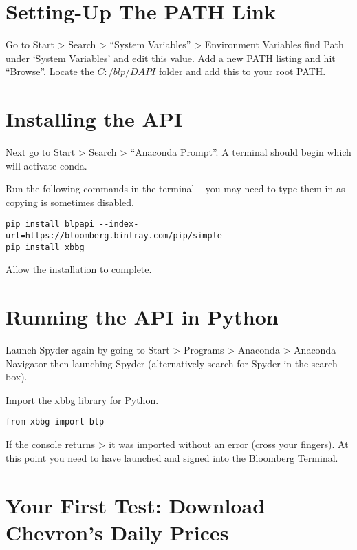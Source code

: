 \documentclass[]{book}
\begin{document}
\section{Setting-Up The PATH Link}\label{setting-up-the-path-link}

Go to Start \textgreater{} Search \textgreater{} ``System Variables''
\textgreater{} Environment Variables find Path under `System Variables'
and edit this value. Add a new PATH listing and hit ``Browse''. Locate
the \(C:/ blp/DAPI\) folder and add this to your root PATH.

\section{Installing the API}\label{installing-the-api}

Next go to Start \textgreater{} Search \textgreater{} ``Anaconda
Prompt''. A terminal should begin which will activate conda.

Run the following commands in the terminal -- you may need to type them
in as copying is sometimes disabled.

\begin{verbatim}
pip install blpapi --index-url=https://bloomberg.bintray.com/pip/simple
pip install xbbg
\end{verbatim}

Allow the installation to complete.

\section{Running the API in Python}\label{running-the-api-in-python}

Launch Spyder again by going to Start \textgreater{} Programs
\textgreater{} Anaconda \textgreater{} Anaconda Navigator then launching
Spyder (alternatively search for Spyder in the search box).

Import the xbbg library for Python.

\begin{verbatim}
from xbbg import blp
\end{verbatim}

If the console returns \textgreater{} it was imported without an error
(cross your fingers). At this point you need to have launched and signed
into the Bloomberg Terminal.

\section{Your First Test: Download Chevron's Daily
Prices}\label{your-first-test-download-chevrons-daily-prices}
\end{document}
